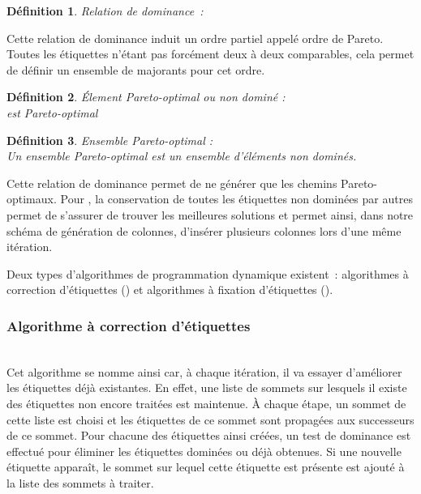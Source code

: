 \documentclass[10pt,francais]{llncs}
\newtheorem{defs}{D\'efinition}
\begin{document}
\begin{defs}
Relation de dominance~:\\

\end{defs}
Cette relation de dominance induit un ordre partiel appel\'e ordre de Pareto. Toutes les \'etiquettes n'\'etant pas forc\'ement deux \`a deux comparables, cela permet de d\'efinir un ensemble de majorants pour cet ordre.
\begin{defs}
\'Element Pareto-optimal ou non domin\'e :\\
 est Pareto-optimal 
\end{defs}
\begin{defs}
Ensemble Pareto-optimal :\\
Un ensemble Pareto-optimal est un ensemble d'\'el\'ements non domin\'es.\\

\end{defs}
Cette relation de dominance permet de ne g\'en\'erer que les chemins Pareto-optimaux. Pour , la conservation de toutes les \'etiquettes non domin\'ees par  autres permet de s'assurer de trouver les  meilleures solutions et permet ainsi, dans notre sch\'ema de g\'en\'eration de colonnes, d'ins\'erer plusieurs colonnes lors d'une m\^eme it\'eration.

Deux types d'algorithmes de programmation dynamique existent~: algorithmes \`a correction d'\'etiquettes (\cite{Desrosiers1983}) et algorithmes \`a fixation d'\'etiquettes (\cite{Desrochers1988}).

\subsubsection{Algorithme \`a correction d'\'etiquettes \cite{Desrosiers1983}}\label{subsub-resol-progdyn-corr}
~\\
Cet algorithme se nomme ainsi car, \`a chaque it\'eration, il va essayer d'am\'eliorer les \'etiquettes d\'ej\`a existantes. En effet, une liste de sommets sur lesquels il existe des \'etiquettes non encore trait\'ees est maintenue. \`A chaque \'etape, un sommet de cette liste est choisi et les \'etiquettes de ce sommet sont propag\'ees aux successeurs de ce sommet. Pour chacune des \'etiquettes ainsi cr\'e\'ees, un test de dominance est effectu\'e pour \'eliminer les \'etiquettes domin\'ees ou d\'ej\`a obtenues. Si une nouvelle \'etiquette appara\^it, le sommet sur lequel cette \'etiquette est pr\'esente est ajout\'e \`a la liste des sommets \`a traiter.
\end{document}
